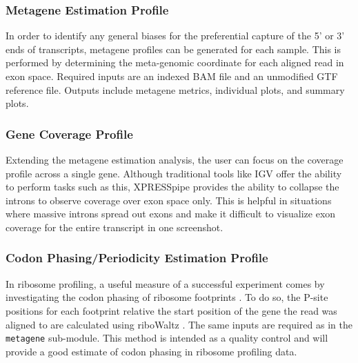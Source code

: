 \documentclass[11pt, a4paper, oneside]{article}
\begin{document}
\subsubsection{Metagene Estimation Profile}
In order to identify any general biases for the preferential capture of the 5' or 3' ends of transcripts, metagene profiles can be generated for each sample. This is performed by determining the meta-genomic coordinate for each aligned read in exon space. Required inputs are an indexed BAM file and an unmodified GTF reference file. Outputs include metagene metrics, individual plots, and summary plots.

\subsubsection{Gene Coverage Profile}
Extending the metagene estimation analysis, the user can focus on the coverage profile across a single gene. Although traditional tools like IGV \cite{igv} offer the ability to perform tasks such as this, XPRESSpipe provides the ability to collapse the introns to observe coverage over exon space only. This is helpful in situations where massive introns spread out exons and make it difficult to visualize exon coverage for the entire transcript in one screenshot.

\subsubsection{Codon Phasing/Periodicity Estimation Profile}
In ribosome profiling, a useful measure of a successful experiment comes by investigating the codon phasing of ribosome footprints \cite{ingolia_meth}. To do so, the P-site positions for each footprint relative the start position of the gene the read was aligned to are calculated using riboWaltz \cite{ribowaltz}. The same inputs are required as in the \texttt{metagene} sub-module. This method is intended as a quality control and will provide a good estimate of codon phasing in ribosome profiling data.
\end{document}
